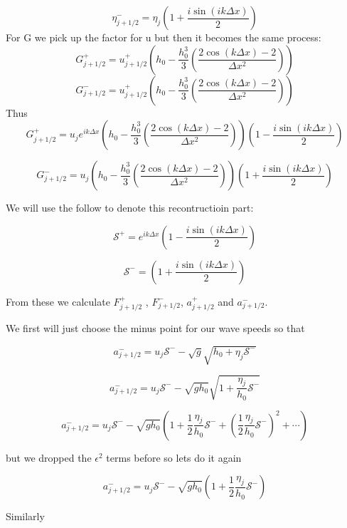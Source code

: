 \documentclass[12pt]{article}
\begin{document}
\[\eta^-_{j + 1/2} = \eta_{j}\left( 1 + \frac{i\sin\left({ik\Delta x}\right) }{2}\right) \]
For G we pick up the factor for u but then it becomes the same process:
\[G^+_{j + 1/2} = u^+_{j + 1/2} \left( h_0 -  \frac{h_0^3}{3} \left(\dfrac{2\cos\left(k{\Delta x}\right) - 2}{\Delta x^2}\right) \right)\]
\[G^-_{j + 1/2} = u^+_{j + 1/2} \left( h_0 -  \frac{h_0^3}{3} \left(\dfrac{2\cos\left(k{\Delta x}\right) - 2}{\Delta x^2}\right) \right)\]
Thus
\[G^+_{j + 1/2} = u_{j} e^{ik\Delta x}  \left( h_0 -  \frac{h_0^3}{3} \left(\dfrac{2\cos\left(k{\Delta x}\right) - 2}{\Delta x^2}\right) \right)  \left(1 -\frac{i \sin\left(ik\Delta x\right)  }{2} \right) \]

\[G^-_{j + 1/2} = u_{j}\left( h_0 -  \frac{h_0^3}{3} \left(\dfrac{2\cos\left(k{\Delta x}\right) - 2}{\Delta x^2}\right) \right)\left( 1 + \frac{i\sin\left({ik\Delta x}\right) }{2}\right) \]
\newline
\newline
\newline
\newline
\newline
\newline

We will use the follow to denote this recontructioin part:

\[\mathcal{S^+} =  e^{ik\Delta x}   \left(1 -\frac{i \sin\left(ik\Delta x\right)  }{2} \right)\]

\[\mathcal{S^-} =  \left( 1 + \frac{i\sin\left({ik\Delta x}\right) }{2}\right)\]

From these  we calculate $F^+_{j + 1/2}$ , $F^-_{j + 1/2}$, $a_{j + 1/2}^+$ and $a_{j + 1/2}^{-}$. 

We first will just choose the minus point for our wave speeds so that

\[
a^-_{j + 1/2} = 
u_j\mathcal{S}^-  - \sqrt{g}\sqrt{h_0 + \eta_j\mathcal{S}^- }  \]

\[
a^-_{j + 1/2} = 
u_j\mathcal{S}^-  - \sqrt{gh_0}\sqrt{1 +  \frac{\eta_j}{h_0}\mathcal{S}^- }  \]

\[
a^-_{j + 1/2} = 
u_j\mathcal{S}^-  - \sqrt{gh_0}\left( 1 + \frac{1}{2}\frac{\eta_j}{h_0}\mathcal{S}^- + \left(\frac{1}{2}\frac{\eta_j}{h_0}\mathcal{S}^-\right)^2 + \cdots \right) \]


but we dropped the $\epsilon^2$ terms before so lets do it again

\[
a^-_{j + 1/2} = 
u_j\mathcal{S}^-  - \sqrt{gh_0}\left( 1 + \frac{1}{2}\frac{\eta_j}{h_0}\mathcal{S}^-\right) \]

Similarly
\end{document}
